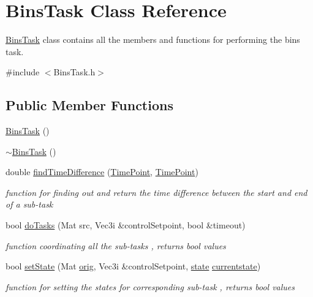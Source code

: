 \hypertarget{classBinsTask}{}\section{Bins\+Task Class Reference}
\label{classBinsTask}


\hyperlink{classBinsTask}{Bins\+Task} class contains all the members and functions for performing the bins task.  




{\ttfamily \#include $<$Bins\+Task.\+h$>$}

\subsection*{Public Member Functions}
\begin{DoxyCompactItemize}
\item 
\hyperlink{classBinsTask_ae281a44a4350b89efee5c1b43fba81ea}{Bins\+Task} ()
\item 
\hyperlink{classBinsTask_a2c2428c70f54f1ca73e107afeb5f9c3b}{$\sim$\+Bins\+Task} ()
\item 
double \hyperlink{classBinsTask_a11bae31515c6203ee470e5000a481fb2}{find\+Time\+Difference} (\hyperlink{thruster__driver_8cpp_ad3e807c387dc076de974ff7eac67ad81}{Time\+Point}, \hyperlink{thruster__driver_8cpp_ad3e807c387dc076de974ff7eac67ad81}{Time\+Point})
\begin{DoxyCompactList}\small\item\em function for finding out and return the time difference between the start and end of a sub-\/task \end{DoxyCompactList}\item 
bool \hyperlink{classBinsTask_a0a9b80db60310bbc553dcc6bb0fd7969}{do\+Tasks} (Mat src, Vec3i \&control\+Setpoint, bool \&timeout)
\begin{DoxyCompactList}\small\item\em function coordinating all the sub-\/tasks , returns bool values \end{DoxyCompactList}\item 
bool \hyperlink{classBinsTask_a7a06b66c2f28876fe5803b545d92b2af}{set\+State} (Mat \hyperlink{classBinsTask_aedf5f6032dcea5fbab09caed34cf80ac}{orig}, Vec3i \&control\+Setpoint, \hyperlink{BinsTask_8h_adc6e5733fc3c22f0a7b2914188c49c90}{state} \hyperlink{classBinsTask_a582b4e240c7018b7119f20c66860a6cf}{currentstate})
\begin{DoxyCompactList}\small\item\em function for setting the states for corresponding sub-\/task , returns bool values \end{DoxyCompactList}\item 

\end{DoxyCompactItemize}
